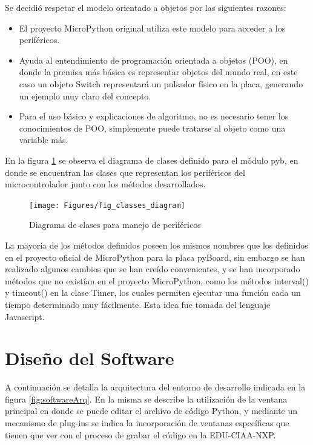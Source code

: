 Se decidió respetar el modelo orientado a objetos por las siguientes razones:

\begin{itemize}
	\item El proyecto MicroPython original utiliza este modelo para acceder a los periféricos.
	\item Ayuda al entendimiento de programación orientada a objetos (POO), en donde la premisa más básica es representar objetos del mundo real, en este caso un objeto Switch representará un pulsador físico en la placa, generando un ejemplo muy claro del concepto.
	\item Para el uso básico y explicaciones de algoritmo, no es necesario tener los conocimientos de POO, simplemente puede tratarse al objeto como una variable más.
\end{itemize}

En la figura \ref{fig:classes} se observa el diagrama de clases definido para el módulo pyb, en donde se encuentran las clases que representan los periféricos del microcontrolador junto con los métodos desarrollados.

\begin{figure}[ht]
  \centering
    \texttt{[image: Figures/fig\_classes\_diagram]}
  \caption{Diagrama de clases para manejo de periféricos}
  \label{fig:classes}
\end{figure}

La mayoría de los métodos definidos poseen los mismos nombres que los definidos en el proyecto oficial de MicroPython para la placa pyBoard, sin embargo se han realizado algunos cambios que se han creído convenientes, y se han incorporado métodos que no existían en el proyecto MicroPython, como los métodos interval() y timeout() en la clase Timer, los cuales permiten ejecutar una función cada un tiempo determinado muy fácilmente. Esta idea fue tomada del lenguaje Javascript.




\section{Diseño del Software}
\label{sec:softwareArq}

A continuación se detalla la arquitectura del entorno de desarrollo indicada en la figura \ref{fig:softwareArq}. En la misma se describe la utilización de la ventana principal en donde se puede editar el archivo de código Python, y mediante un mecanismo de plug-ins se indica la incorporación de ventanas específicas que tienen que ver con el proceso de grabar el código en la EDU-CIAA-NXP. 

